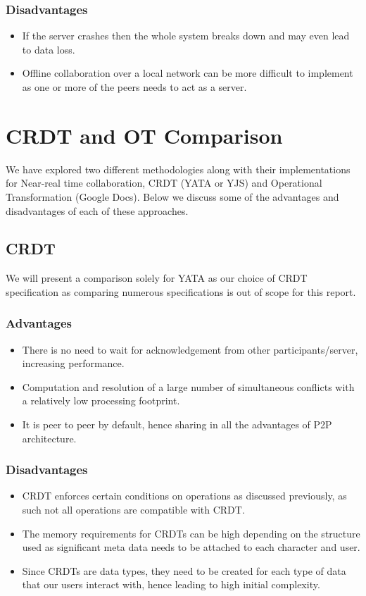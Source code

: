 \documentclass[12pt]{article}
\begin{document}
  \subsubsection*{Disadvantages}
  \begin{itemize}
    \item If the server crashes then the whole system breaks down and may even lead to data loss.
    \item Offline collaboration over a local network can be more difficult to implement as one or more of the peers needs to act as a server.
  \end{itemize}

  \section{CRDT and OT Comparison}
  We have explored two different methodologies along with their implementations for Near-real time collaboration, CRDT (YATA or YJS) and
  Operational Transformation (Google Docs). Below we discuss some of the advantages and disadvantages of each of these approaches.

  \subsection{CRDT}
  We will present a comparison solely for YATA as our choice of CRDT specification as comparing numerous specifications is out of scope for this report.
  
  \subsubsection{Advantages}
  \begin{itemize}
    \item There is no need to wait for acknowledgement from other participants/server, increasing performance.
    \item Computation and resolution of a large number of simultaneous conflicts with a relatively low processing footprint.
    \item It is peer to peer by default, hence sharing in all the advantages of P2P architecture.
  \end{itemize}

  \subsubsection{Disadvantages}
  \begin{itemize}
    \item CRDT enforces certain conditions on operations as discussed previously, as such not all operations are compatible with CRDT.
    \item The memory requirements for CRDTs can be high depending on the structure used as significant meta data needs to be attached to each character and user.
    \item Since CRDTs are data types, they need to be created for each type of data that our users interact with, hence leading to high initial complexity.
  \end{itemize}
\end{document}
